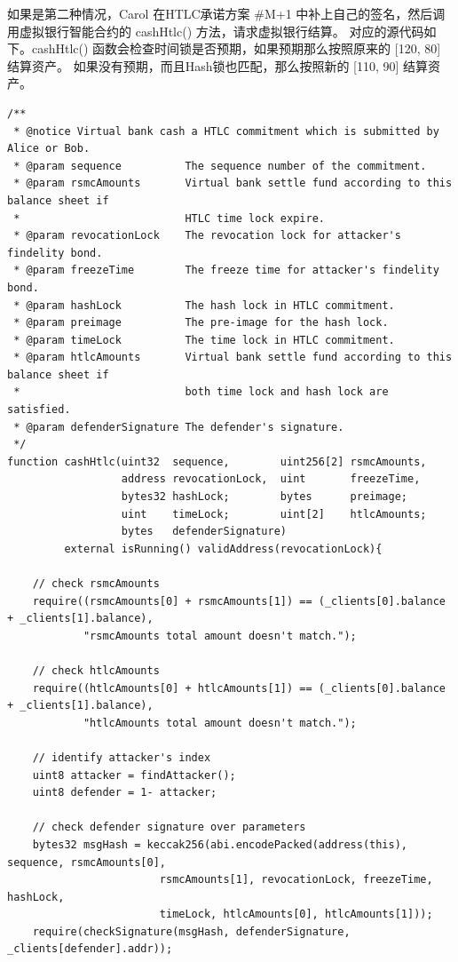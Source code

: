 \begin{appendices}
如果是第二种情况，Carol 在HTLC承诺方案 \#M+1 中补上自己的签名，然后调用虚拟银行智能合约的 cashHtlc() 方法，请求虚拟银行结算。
对应的源代码如下。cashHtlc() 函数会检查时间锁是否预期，如果预期那么按照原来的 [120, 80] 结算资产。
如果没有预期，而且Hash锁也匹配，那么按照新的 [110, 90] 结算资产。

\begin{lstlisting}[caption={兑现HTLC共同承诺}, label={lst:cashHtlc}]
/**
 * @notice Virtual bank cash a HTLC commitment which is submitted by Alice or Bob.
 * @param sequence          The sequence number of the commitment.
 * @param rsmcAmounts       Virtual bank settle fund according to this balance sheet if 
 *                          HTLC time lock expire.
 * @param revocationLock    The revocation lock for attacker's findelity bond.
 * @param freezeTime        The freeze time for attacker's findelity bond.
 * @param hashLock          The hash lock in HTLC commitment.
 * @param preimage          The pre-image for the hash lock.
 * @param timeLock          The time lock in HTLC commitment.
 * @param htlcAmounts       Virtual bank settle fund according to this balance sheet if 
 *                          both time lock and hash lock are satisfied.
 * @param defenderSignature The defender's signature.
 */
function cashHtlc(uint32  sequence,        uint256[2] rsmcAmounts, 
                  address revocationLock,  uint       freezeTime, 
                  bytes32 hashLock;        bytes      preimage;
                  uint    timeLock;        uint[2]    htlcAmounts;
                  bytes   defenderSignature) 
         external isRunning() validAddress(revocationLock){

    // check rsmcAmounts
    require((rsmcAmounts[0] + rsmcAmounts[1]) == (_clients[0].balance + _clients[1].balance), 
            "rsmcAmounts total amount doesn't match.");
    
    // check htlcAmounts
    require((htlcAmounts[0] + htlcAmounts[1]) == (_clients[0].balance + _clients[1].balance), 
            "htlcAmounts total amount doesn't match.");
    
    // identify attacker's index
    uint8 attacker = findAttacker();
    uint8 defender = 1- attacker;
    
    // check defender signature over parameters
    bytes32 msgHash = keccak256(abi.encodePacked(address(this), sequence, rsmcAmounts[0], 
                        rsmcAmounts[1], revocationLock, freezeTime, hashLock, 
                        timeLock, htlcAmounts[0], htlcAmounts[1]));
    require(checkSignature(msgHash, defenderSignature, _clients[defender].addr));
    

\end{lstlisting}
\end{appendices}
